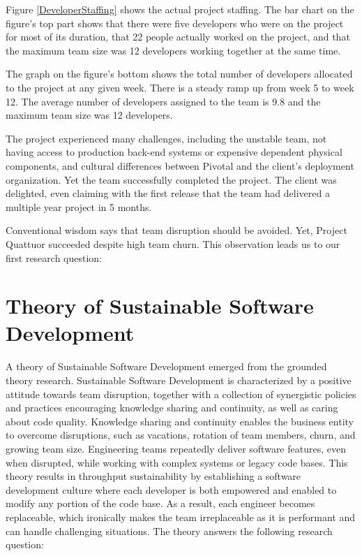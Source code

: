 Figure \ref{DeveloperStaffing} shows the actual project staffing.  The bar chart on the figure's top part shows that there were five developers who were on the project for most of its duration, that 22 people actually worked on the project, and that the maximum team size was 12 developers working together at the same time.

The graph on the figure's bottom shows the total number of developers allocated to the project at any given week. There is a steady ramp up from week 5 to week 12. The average number of developers assigned to the team is 9.8 and the maximum team size was 12 developers.

The project experienced many challenges, including the unstable team, not having access to production back-end systems or expensive dependent physical components, and cultural differences between Pivotal and the client's deployment organization. Yet the team successfully completed the project. The client was delighted, even claiming with the first release that the team had delivered a multiple year project in 5 months. 

Conventional wisdom says that team disruption should be avoided. Yet, Project Quattuor succeeded despite high team churn. This observation leads us to our first research question: 

\section{Theory of Sustainable Software Development}
\label{Theory}

A theory of Sustainable Software Development emerged from the grounded theory research. Sustainable Software Development is characterized by a positive attitude towards team disruption, together with a collection of synergistic policies and practices encouraging knowledge sharing and continuity, as well as caring about code quality. Knowledge sharing and continuity enables the business entity to overcome disruptions, such as vacations, rotation of team members, churn, and growing team size. Engineering teams repeatedly deliver software features, even when disrupted, while working with complex systems or legacy code bases. This theory results in throughput sustainability by establishing a software development culture where each developer is both empowered and enabled to modify any portion of the code base. As a result, each engineer becomes replaceable, which ironically makes the team irreplaceable as it is performant and can handle challenging situations. The theory answers the following research question:

